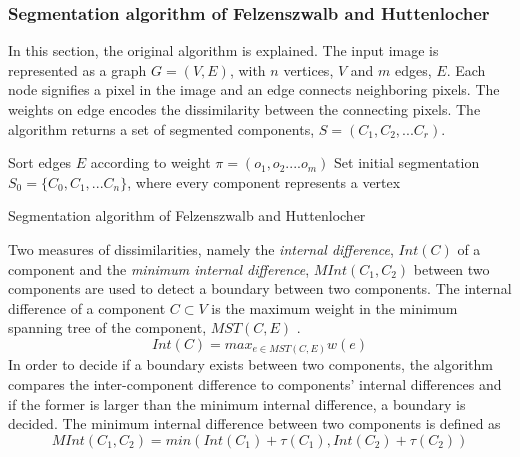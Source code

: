 \documentclass[12pt,twoside]{article}
\theoremstyle{plain}
\theoremstyle{definition}
\theoremstyle{remark}
\begin{document}
\subsubsection{Segmentation algorithm of Felzenszwalb and Huttenlocher}
\label{sec:felz}
In this section, the original algorithm \cite{felzenszwalb2004efficient} is explained. The input image is represented as a graph $G = (V,E)$, with $n$ vertices, $V$ and $m$ edges, $E$. Each node signifies a pixel in the image and an edge connects neighboring pixels. The weights on edge encodes the dissimilarity between the connecting pixels. The algorithm returns a set of segmented components, $S = (C_1,C_2,...C_r)$. \\
\begin{algorithm}[H]
\label{alg:felz}
\SetAlgoLined
{}
Sort edges $E$ according to weight $\pi = (o_1, o_2....o_m)$\;
Set initial segmentation $S_0 = \{C_0,C_1,...C_n\}$, where every component represents a vertex\;
\caption{Segmentation algorithm of Felzenszwalb and Huttenlocher \cite{felzenszwalb2004efficient}}
\end{algorithm}
Two measures of dissimilarities, namely the \textit{internal difference}, $Int(C)$ of a component and the \textit{minimum internal difference}, $MInt(C_1,C_2)$ between two components are used to detect a boundary between two components. The internal difference of a component $C \subset V$ is the maximum weight in the minimum spanning tree of the component, $MST(C, E)$ \cite{felzenszwalb2004efficient}.
\begin{equation}
\label{eq:int_diff}
Int(C) = max_{e \in MST(C,E)} w(e)
\end{equation}
In order to decide if a boundary exists between two components, the algorithm compares the inter-component difference to components' internal differences and if the former is larger than the minimum internal difference, a boundary is decided. The minimum internal difference between two components is defined as\\
\begin{equation}
\label{eq:mint}
MInt(C_1,C_2) = min(Int(C_1)+\tau(C_1), Int(C_2)+\tau(C_2))
\end{equation}
\end{document}
